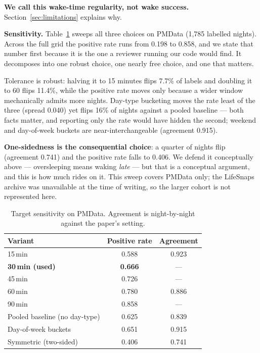 \documentclass[conference]{IEEEtran}
\begin{document}
\textbf{We call this wake-time regularity, not wake success.}
Section~\ref{sec:limitations} explains why.

\textbf{Sensitivity.} Table~\ref{tab:sens} sweeps all three choices on PMData
(1{,}785 labelled nights). Across the full grid the positive rate runs from
0.198 to 0.858, and we state that number first because it is the one a reviewer
running our code would find. It decomposes into one robust choice, one nearly
free choice, and one that matters.

Tolerance is robust: halving it to 15 minutes flips 7.7\% of labels and doubling
it to 60 flips 11.4\%, while the positive rate moves only because a wider window
mechanically admits more nights. Day-type bucketing moves the rate least of the
three (spread 0.040) yet flips 16\% of nights against a pooled baseline --- both
facts matter, and reporting only the rate would have hidden the second;
weekend and day-of-week buckets are near-interchangeable (agreement 0.915).

\textbf{One-sidedness is the consequential choice}: a quarter of nights flip
(agreement 0.741) and the positive rate falls to 0.406. We defend it
conceptually above --- oversleeping means waking \emph{late} --- but that is a
conceptual argument, and this is how much rides on it. This sweep covers PMData
only; the LifeSnaps archive was unavailable at the time of writing, so the
larger cohort is not represented here.

\begin{table}[t]
\caption{Target sensitivity on PMData. Agreement is night-by-night against the
paper's setting.}
\label{tab:sens}
\centering
\small
\begin{tabular}{lcc}
\toprule
Variant & Positive rate & Agreement \\
\midrule
15\,min & 0.588 & 0.923 \\
\textbf{30\,min (used)} & \textbf{0.666} & --- \\
45\,min & 0.726 & --- \\
60\,min & 0.780 & 0.886 \\
90\,min & 0.858 & --- \\
\midrule
Pooled baseline (no day-type) & 0.625 & 0.839 \\
Day-of-week buckets & 0.651 & 0.915 \\
Symmetric (two-sided) & 0.406 & 0.741 \\
\bottomrule
\end{tabular}
\end{table}
\end{document}
